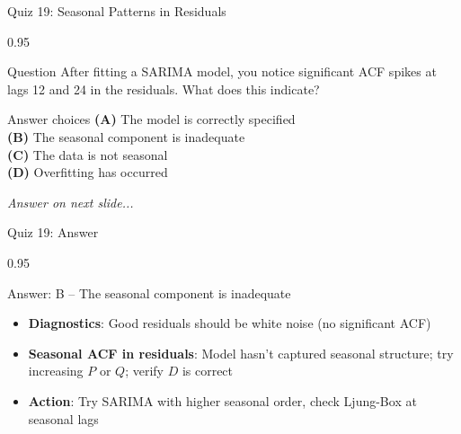 \documentclass[9pt, aspectratio=169, t]{beamer}
\begin{document}
\begin{frame}{Quiz 19: Seasonal Patterns in Residuals}
    \begin{cminipage}{0.95\textwidth}
    \begin{alertblock}{Question}
        After fitting a SARIMA model, you notice significant ACF spikes at lags 12 and 24 in the residuals. What does this indicate?
    \end{alertblock}

    \vspace{0.4cm}

    \begin{block}{Answer choices}
        \textcolor{MainBlue}{\textbf{(A)}} The model is correctly specified\\[3pt]
        \textcolor{MainBlue}{\textbf{(B)}} The seasonal component is inadequate\\[3pt]
        \textcolor{MainBlue}{\textbf{(C)}} The data is not seasonal\\[3pt]
        \textcolor{MainBlue}{\textbf{(D)}} Overfitting has occurred
    \end{block}

    \vspace{0.5cm}

    \begin{center}
        \textit{Answer on next slide...}
    \end{center}
    \end{cminipage}
\end{frame}

\begin{frame}{Quiz 19: Answer}
    \begin{cminipage}{0.95\textwidth}
    \begin{exampleblock}{Answer: B -- The seasonal component is inadequate}
        \begin{itemize}
            \item \textbf{Diagnostics}: Good residuals should be white noise (no significant ACF)
            \item \textbf{Seasonal ACF in residuals}: Model hasn't captured seasonal structure; try increasing $P$ or $Q$; verify $D$ is correct
            \item \textbf{Action}: Try SARIMA with higher seasonal order, check Ljung-Box at seasonal lags
        \end{itemize}
    \end{exampleblock}

    \end{cminipage}
\end{frame}
\end{document}
